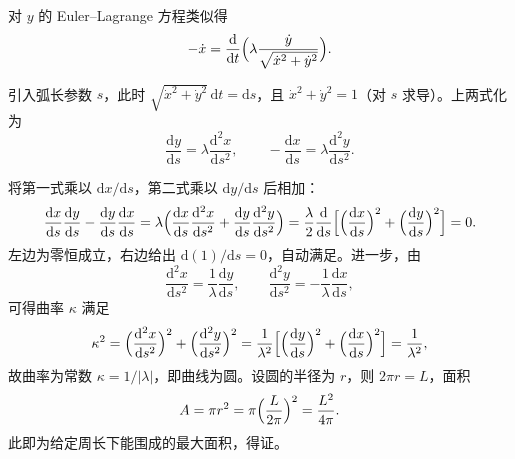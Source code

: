 \begin{question}
\begin{solution}
对 \(y\) 的 Euler--Lagrange 方程类似得
\[
-\dot x = \frac{\mathrm d}{\mathrm dt}\Bigl(\lambda\frac{\dot y}{\sqrt{\dot x^2 + \dot y^2}}\Bigr).
\]

引入弧长参数 \(s\)，此时 \(\sqrt{\dot x^2 + \dot y^2}\,\mathrm dt = \mathrm ds\)，且 \(\dot x^2 + \dot y^2 = 1\)（对 \(s\) 求导）。上两式化为
\[
\frac{\mathrm d y}{\mathrm d s} = \lambda\frac{\mathrm d^2 x}{\mathrm d s^2},\qquad
-\frac{\mathrm d x}{\mathrm d s} = \lambda\frac{\mathrm d^2 y}{\mathrm d s^2}.
\]

将第一式乘以 \(\mathrm d x/\mathrm d s\)，第二式乘以 \(\mathrm d y/\mathrm d s\) 后相加：
\[
\frac{\mathrm d x}{\mathrm d s}\frac{\mathrm d y}{\mathrm d s}
- \frac{\mathrm d y}{\mathrm d s}\frac{\mathrm d x}{\mathrm d s}
= \lambda\Bigl(\frac{\mathrm d x}{\mathrm d s}\frac{\mathrm d^2 x}{\mathrm d s^2}
+ \frac{\mathrm d y}{\mathrm d s}\frac{\mathrm d^2 y}{\mathrm d s^2}\Bigr)
= \frac{\lambda}{2}\frac{\mathrm d}{\mathrm d s}\Bigl[\Bigl(\frac{\mathrm d x}{\mathrm d s}\Bigr)^2
+ \Bigl(\frac{\mathrm d y}{\mathrm d s}\Bigr)^2\Bigr] = 0 .
\]
左边为零恒成立，右边给出 \(\mathrm d(1)/\mathrm ds = 0\)，自动满足。进一步，由
\[
\frac{\mathrm d^2 x}{\mathrm d s^2} = \frac{1}{\lambda}\frac{\mathrm d y}{\mathrm d s},\qquad
\frac{\mathrm d^2 y}{\mathrm d s^2} = -\frac{1}{\lambda}\frac{\mathrm d x}{\mathrm d s},
\]
可得曲率 \(\kappa\) 满足
\[
\kappa^2 = \Bigl(\frac{\mathrm d^2 x}{\mathrm d s^2}\Bigr)^2
+ \Bigl(\frac{\mathrm d^2 y}{\mathrm d s^2}\Bigr)^2
= \frac{1}{\lambda^2}\Bigl[\Bigl(\frac{\mathrm d y}{\mathrm d s}\Bigr)^2
+ \Bigl(\frac{\mathrm d x}{\mathrm d s}\Bigr)^2\Bigr] = \frac{1}{\lambda^2},
\]
故曲率为常数 \(\kappa = 1/|\lambda|\)，即曲线为圆。设圆的半径为 \(r\)，则 \(2\pi r = L\)，面积
\[
A = \pi r^2 = \pi\Bigl(\frac{L}{2\pi}\Bigr)^2 = \frac{L^2}{4\pi}.
\]
此即为给定周长下能围成的最大面积，得证。
\end{solution}
\end{question}
